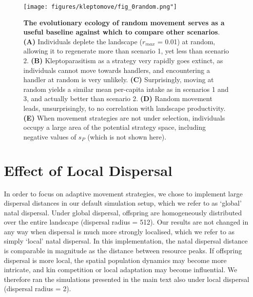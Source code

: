 {\begin{figure}
    \centering
    \texttt{[image: figures/kleptomove/fig\_0random.png"]}
    \caption{\textbf{The evolutionary ecology of random movement serves as a useful baseline against which to compare other scenarios}. \textbf{(A)} Individuals deplete the landscape (\(r_{max}\) = 0.01) at random, allowing it to regenerate more than scenario 1, yet less than scenario 2. \textbf{(B)} Kleptoparasitism as a strategy very rapidly goes extinct, as individuals cannot move towards handlers, and encountering a handler at random is very unlikely. \textbf{(C)} Surprisingly, moving at random yields a similar mean per-capita intake as in scenarios 1 and 3, and actually better than scenario 2. \textbf{(D)} Random movement leads, unsurprisingly, to no correlation with landscape productivity. \textbf{(E)} When movement strategies are not under selection, individuals occupy a large area of the potential strategy space, including negative values of \(s_P\) (which is not shown here).}
    \label{fig:klept_move_random}
\end{figure}

\section*{Effect of Local Dispersal}

In order to focus on adaptive movement strategies, we chose to implement large dispersal distances in our default simulation setup, which we refer to as `global' natal dispersal.
Under global dispersal, offspring are homogeneously distributed over the entire landscape (dispersal radius = 512).
Our results are not changed in any way when dispersal is much more strongly localised, which we refer to as simply `local' natal dispersal.
In this implementation, the natal dispersal distance is comparable in magnitude as the distance between resource peaks.
If offspring dispersal is more local, the spatial population dynamics may become more intricate, and kin competition or local adaptation may become influential. We therefore ran the simulations presented in the main text also under local dispersal (dispersal radius = 2).

}
